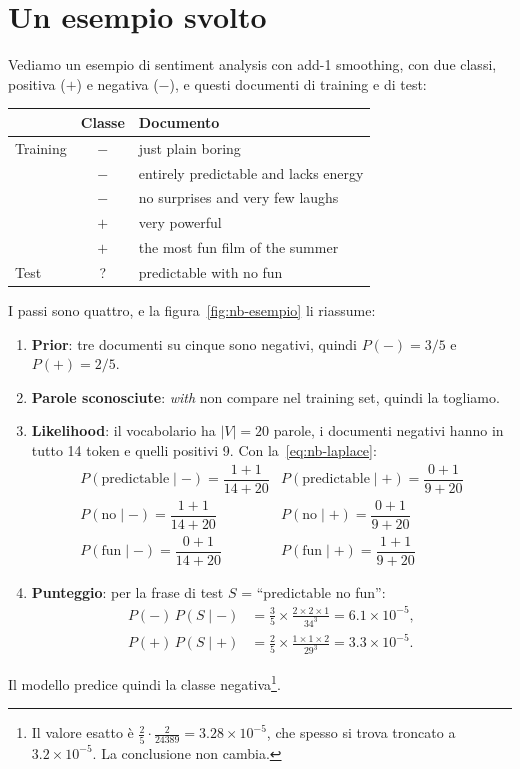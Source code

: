 \section{Un esempio svolto}\label{sec:nb-esempio}
Vediamo un esempio di sentiment analysis con add-1 smoothing, con due classi, positiva ($+$) e negativa ($-$), e questi documenti di training e di test:
\begin{center}
\begin{tabular}{lcl}
\toprule
 & Classe & Documento \\
\midrule
Training & $-$ & just plain boring \\
 & $-$ & entirely predictable and lacks energy \\
 & $-$ & no surprises and very few laughs \\
 & $+$ & very powerful \\
 & $+$ & the most fun film of the summer \\
\midrule
Test & ? & predictable with no fun \\
\bottomrule
\end{tabular}
\end{center}
I passi sono quattro, e la figura~\ref{fig:nb-esempio} li riassume:
\begin{enumerate}
    \item \textbf{Prior}: tre documenti su cinque sono negativi, quindi $P(-) = 3/5$ e $P(+) = 2/5$.
    \item \textbf{Parole sconosciute}: \textit{with} non compare nel training set, quindi la togliamo.
    \item \textbf{Likelihood}: il vocabolario ha $|V| = 20$ parole, i documenti negativi hanno in tutto 14 token e quelli positivi 9. Con la~\eqref{eq:nb-laplace}:
    \[
    \begin{array}{ll}
    P(\text{predictable} \mid -) = \dfrac{1 + 1}{14 + 20} & P(\text{predictable} \mid +) = \dfrac{0 + 1}{9 + 20} \\[10pt]
    P(\text{no} \mid -) = \dfrac{1 + 1}{14 + 20} & P(\text{no} \mid +) = \dfrac{0 + 1}{9 + 20} \\[10pt]
    P(\text{fun} \mid -) = \dfrac{0 + 1}{14 + 20} & P(\text{fun} \mid +) = \dfrac{1 + 1}{9 + 20}
    \end{array}
    \]
    \item \textbf{Punteggio}: per la frase di test $S$ = \enquote{predictable no fun}:
    \[
    \begin{aligned}
    P(-)\, P(S \mid -) &= \frac{3}{5} \times \frac{2 \times 2 \times 1}{34^3} = 6.1 \times 10^{-5}, \\
    P(+)\, P(S \mid +) &= \frac{2}{5} \times \frac{1 \times 1 \times 2}{29^3} = 3.3 \times 10^{-5}.
    \end{aligned}
    \]
\end{enumerate}
Il modello predice quindi la classe negativa\footnote{Il valore esatto è $\frac{2}{5} \cdot \frac{2}{24389} = 3.28 \times 10^{-5}$, che spesso si trova troncato a $3.2 \times 10^{-5}$. La conclusione non cambia.}.

